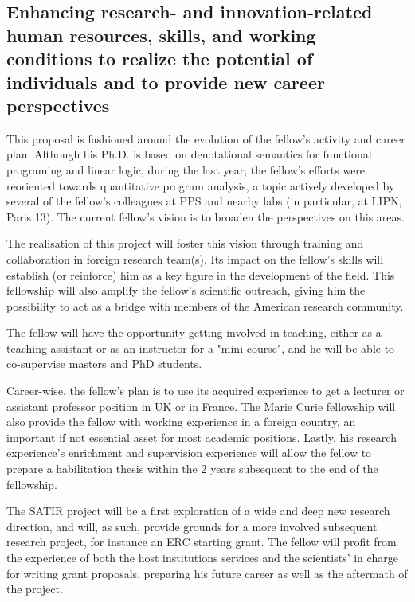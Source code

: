 \documentclass{article}[11pt]
\begin{document}
\subsection{Enhancing research- and innovation-related human resources, skills, and working conditions to realize the potential of individuals and to provide new career perspectives}

This proposal is fashioned around the evolution of the fellow’s activity and career plan. Although his Ph.D. is based on denotational semantics for functional programing and linear logic, during the last year; the fellow’s efforts were reoriented towards quantitative program analysis, a topic actively developed by several of the fellow’s colleagues at PPS and nearby labs (in particular, at LIPN, Paris 13). The current fellow’s vision is to broaden the perspectives on this areas. 

The realisation of this project will foster this vision through training and collaboration in foreign research team(s). Its impact on the fellow’s skills will establish (or reinforce) him as a key figure in the development of the field. This fellowship will also amplify the fellow’s scientific outreach, giving him the possibility to act as a bridge with members of the American research community.

The fellow will have the opportunity getting involved in teaching, either as a teaching assistant or as an instructor for a "mini course", and he will be able to co-supervise masters and PhD students.

Career-wise, the fellow’s plan is to use its acquired experience to get a lecturer or assistant professor position in UK or in France. The Marie Curie fellowship will also provide the fellow with working experience in a foreign country, an important if not essential asset for most academic positions.  Lastly, his research experience’s enrichment and supervision experience will allow the fellow to prepare a habilitation thesis within the 2 years subsequent to the end of the fellowship.

The SATIR project will be a first exploration of a wide and deep new research direction, and will, as such, provide grounds for a more involved subsequent research project, for instance an ERC starting grant. The fellow will profit from the experience of both the host institutions services and the scientists’ in charge for writing grant proposals, preparing his future career as well as the aftermath of the project.
\end{document}
